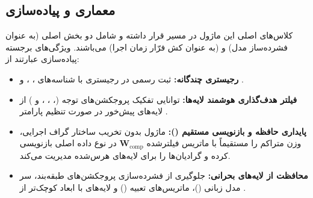 \subsection{معماری و پیاده‌سازی}
کلاس‌های اصلی این ماژول در مسیر  قرار داشته و شامل دو بخش اصلی  (به عنوان فشرده‌ساز مدل) و  (به عنوان کش فرّار زمان اجرا) می‌باشند. ویژگی‌های برجسته پیاده‌سازی عبارتند از:
\begin{itemize}
    \item \textbf{رجیستری چندگانه:} ثبت رسمی در رجیستری با شناسه‌های ، ،  و .
    \item \textbf{فیلتر هدف‌گذاری هوشمند لایه‌ها:} توانایی تفکیک پروجکشن‌های توجه (، ، ،  و ) از لایه‌های پیش‌خور در صورت تنظیم پارامتر .
    \item \textbf{پایداری حافظه و بازنویسی مستقیم ():} ماژول بدون تخریب ساختار گراف اجرایی، وزن متراکم را مستقیماً با ماتریس فیلترشده $\mathbf{W}_{\text{comp}}$ در نوع داده اصلی بازنویسی کرده و گرادیان‌ها را برای لایه‌های هرس‌شده مدیریت می‌کند.
    \item \textbf{محافظت از لایه‌های بحرانی:} جلوگیری از فشرده‌سازی پروجکشن‌های طبقه‌بند، سر مدل زبانی ()، ماتریس‌های تعبیه () و لایه‌های با ابعاد کوچک‌تر از .
\end{itemize}
